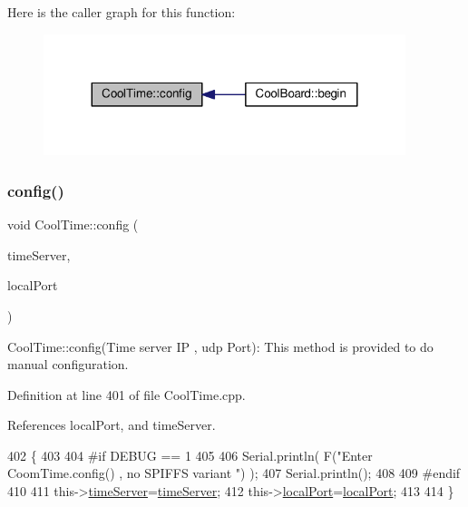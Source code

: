 Here is the caller graph for this function\+:
\nopagebreak
\begin{figure}[H]
\begin{center}
\leavevmode
\includegraphics[width=299pt]{classCoolTime_a87c28260c1bc77091162cbcf1ee2e129_icgraph}
\end{center}
\end{figure}
\mbox{\label{classCoolTime_a014656d0d3f74d6391364b92b13e0780}} 
\subsubsection{\texorpdfstring{config()}{config()}\hspace{0.1cm}{\footnotesize\ttfamily [2/2]}}
{\footnotesize\ttfamily void Cool\+Time\+::config (\begin{DoxyParamCaption}\item[{I\+P\+Address}]{time\+Server,  }\item[{unsigned int}]{local\+Port }\end{DoxyParamCaption})}

Cool\+Time\+::config(\+Time server I\+P , udp Port)\+: This method is provided to do manual configuration. 

Definition at line 401 of file Cool\+Time.\+cpp.



References local\+Port, and time\+Server.


\begin{DoxyCode}
402 \{
403 
404 \textcolor{preprocessor}{#if DEBUG == 1 }
405 
406     Serial.println( F(\textcolor{stringliteral}{"Enter CoomTime.config() , no SPIFFS variant "}) );
407     Serial.println();
408 
409 \textcolor{preprocessor}{#endif }
410 
411     this->\hyperlink{classCoolTime_ad2b9858f399108cb440dd1e908916f04}{timeServer}=\hyperlink{classCoolTime_ad2b9858f399108cb440dd1e908916f04}{timeServer};
412     this->\hyperlink{classCoolTime_a2f777da44d7ba678be8185299e9b49d1}{localPort}=\hyperlink{classCoolTime_a2f777da44d7ba678be8185299e9b49d1}{localPort};
413     
414 \} 
\end{DoxyCode}
\mbox{\label{classCoolTime_acd537cd4210d7bde4e1f5c47d2ac0456}} 
